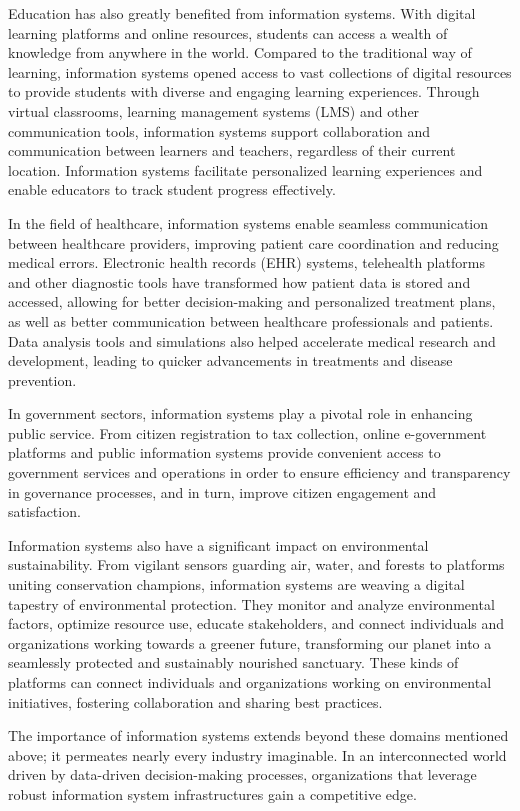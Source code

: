 \documentclass[
  letterpaper,
  DIV=11,
  numbers=noendperiod]{scrreprt}
\begin{document}
Education has also greatly benefited from information systems. With
digital learning platforms and online resources, students can access a
wealth of knowledge from anywhere in the world. Compared to the
traditional way of learning, information systems opened access to vast
collections of digital resources to provide students with diverse and
engaging learning experiences. Through virtual classrooms, learning
management systems (LMS) and other communication tools, information
systems support collaboration and communication between learners and
teachers, regardless of their current location. Information systems
facilitate personalized learning experiences and enable educators to
track student progress effectively.

In the field of healthcare, information systems enable seamless
communication between healthcare providers, improving patient care
coordination and reducing medical errors. Electronic health records
(EHR) systems, telehealth platforms and other diagnostic tools have
transformed how patient data is stored and accessed, allowing for better
decision-making and personalized treatment plans, as well as better
communication between healthcare professionals and patients. Data
analysis tools and simulations also helped accelerate medical research
and development, leading to quicker advancements in treatments and
disease prevention.

In government sectors, information systems play a pivotal role in
enhancing public service. From citizen registration to tax collection,
online e-government platforms and public information systems provide
convenient access to government services and operations in order to
ensure efficiency and transparency in governance processes, and in turn,
improve citizen engagement and satisfaction.

Information systems also have a significant impact on environmental
sustainability. From vigilant sensors guarding air, water, and forests
to platforms uniting conservation champions, information systems are
weaving a digital tapestry of environmental protection. They monitor and
analyze environmental factors, optimize resource use, educate
stakeholders, and connect individuals and organizations working towards
a greener future, transforming our planet into a seamlessly protected
and sustainably nourished sanctuary. These kinds of platforms can
connect individuals and organizations working on environmental
initiatives, fostering collaboration and sharing best practices.

The importance of information systems extends beyond these domains
mentioned above; it permeates nearly every industry imaginable. In an
interconnected world driven by data-driven decision-making processes,
organizations that leverage robust information system infrastructures
gain a competitive edge.
\end{document}

